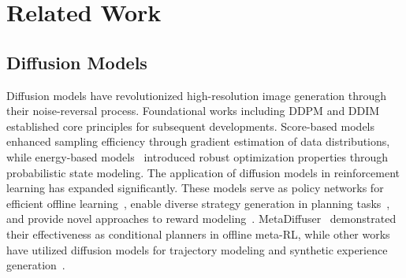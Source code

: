 \vspace{-2em}
\section{Related Work}

\subsection{Diffusion Models}
\vspace{-0.7em}
Diffusion models have revolutionized high-resolution image generation through their noise-reversal process. Foundational works including DDPM \cite{ho2020ddpm} and DDIM \cite{song2021ddim} established core principles for subsequent developments. Score-based models~\cite{song2019generative, song2021scorebased} enhanced sampling efficiency through gradient estimation of data distributions, while energy-based models~\cite{du2024reducereuserecyclecompositional} introduced robust optimization properties through probabilistic state modeling. The application of diffusion models in reinforcement learning has expanded significantly. These models serve as policy networks for efficient offline learning~\cite{wang2023diffusion, ajay2023is, pearce2023imitating}, enable diverse strategy generation in planning tasks~\cite{janner2022planningdiffusionflexiblebehavior, liang2023adaptdiffuser}, and provide novel approaches to reward modeling~\cite{nuti2023extracting}. MetaDiffuser~\cite{ni2023metadiffuserdiffusionmodelconditional} demonstrated their effectiveness as conditional planners in offline meta-RL, while other works have utilized diffusion models for trajectory modeling and synthetic experience generation~\cite{lu2023synthetic}.
\vspace{-0.7em}

